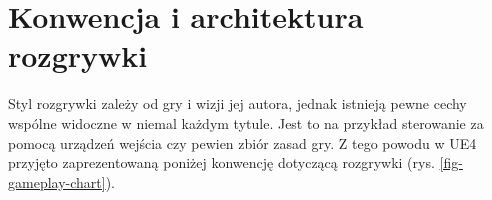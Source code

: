 \documentclass[multip]{SGGW-thesis}
\begin{document}
\section{Konwencja i architektura rozgrywki}
\label{sec:konwencja}
Styl rozgrywki zależy od gry i wizji jej autora, jednak istnieją pewne cechy wspólne widoczne w niemal każdym tytule. Jest to na przykład sterowanie za pomocą urządzeń wejścia czy pewien zbiór zasad gry. Z tego powodu w UE4 przyjęto zaprezentowaną poniżej konwencję dotyczącą rozgrywki (rys. \ref{fig-gameplay-chart})\cite{docs-gameplay-framework}.
\end{document}
